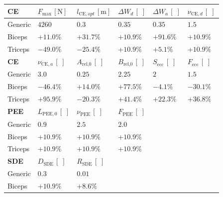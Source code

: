 \begin{table}[t]
\begin{tabular}{@{}llllll@{}}
% 
     \toprule
    \textbf{CE} 
      & $F_{\mathrm{max}}\,[\mathrm{N}]$
      & $l_{\mathrm{CE},opt}\,[\mathrm{m}]$ 
      & $\Delta W_{d} \,[\;]$ 
      & $\Delta W_{a} \,[\;]$ 
      & $\nu_{\mathrm{CE},d} \,[\;]$ \\  \midrule
    Generic & $4260$ & $0.3$ & $0.35$ & $0.35$ & $1.5$  \\ %
    Biceps  & $+11.0\%$ & $+31.7\%$ & $+10.9\%$ & $+91.6\%$ & $+10.9\%$  \\ %
    Triceps & $-49.0\%$ & $-25.4\%$ & $+10.9\%$ & $+5.1\%$ & $+10.9\%$  \\ %
    \addlinespace[2ex]
    \textbf{CE} 
      &  $\nu_{\mathrm{CE},a} \,[\;]$ 
      & $A_\text{rel,0} \,[\;]$  
      & $B_\text{rel,0} \,[\;]$ 
      & $S_\text{ecc} \,[\;]$ 
      & $F_\text{ecc} \,[\;]$\\  \hline
    Generic & $3.0$ & $0.25$ & $2.25$ & $2$ & $1.5$ \\ %
    Biceps & $-46.4\%$ & $+14.0\%$ & $+77.5\%$ & $-4.1\%$ & $-30.1\%$ \\ %
    Triceps &  $+95.9\%$ & $-20.3\%$ & $+41.4\%$ & $+22.3\%$ & $+36.8\%$ \\ %
    \addlinespace[2ex]
    \textbf{PEE} 
      & $L_{\mathrm{PEE},0} \,[\;]$ 
      & $\nu_{\mathrm{PEE}} \,[\;]$ 
      & $F_{\mathrm{PEE}} \,[\;]$
      \\ \hline
    Generic & $0.9$ & $2.5$ & $2.0$  \\ %
    Biceps & $+10.9\%$ & $+10.9\%$ & $+10.9\%$  \\ %
    Triceps & $+10.9\%$ & $+10.9\%$ & $+10.9\%$  \\ %
    \addlinespace[2ex]
    \textbf{SDE} 
      & $D_{\mathrm{SDE}} \,[\;]$ 
      & $R_{\mathrm{SDE}} \,[\;]$ 
      \\ \midrule
    Generic & $0.3$ & $0.01$    \\ %
    Biceps & $+10.9\%$ & $+8.6\%$   \\ %

\end{tabular}
\end{table}
